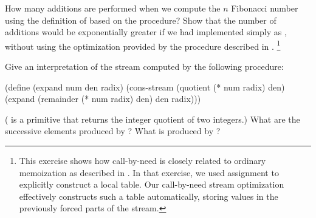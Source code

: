 \begin{exercise}
	\label{Exercise 3.57}
		How many additions are performed when we compute the \( n \) Fibonacci number using the definition of  based on the  procedure?
		Show that the number of additions would be exponentially greater if we had implemented  simply as , without using the optimization provided by the  procedure described in .%
	\footnote{
		This exercise shows how call-by-need is closely related to ordinary memoization as described in .
		In that exercise, we used assignment to explicitly construct a local table.
		Our call-by-need stream optimization effectively constructs such a table automatically, storing values in the previously forced parts of the stream.
	}
\end{exercise}



\begin{exercise}
	\label{Exercise 3.58}
	Give an interpretation of the stream computed by the following procedure:
	\begin{scheme}
	  (define (expand num den radix)
	    (cons-stream
	     (quotient (* num radix) den)
	     (expand (remainder (* num radix) den) den radix)))
	\end{scheme}
	( is a primitive that returns the integer quotient of two
	integers.)
	What are the successive elements produced by ?
	What is produced by ?
\end{exercise}

